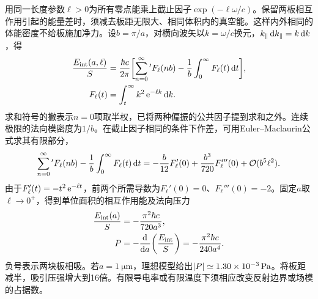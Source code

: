 用同一长度参数$\ell > 0$为所有零点能乘上截止因子$\exp(-\ell\omega/c)$。保留两板相互作用引起的能量差时，须减去板距无限大、相同体积内的真空能。这样内外相同的体能密度不给板施加净力。设$b = \pi/a$，对横向波矢以$k = \omega/c$换元，$k_\parallel\mathop{}\!\mathrm{d} k_\parallel = k\mathop{}\!\mathrm{d} k$，得
\begin{align*}
    \frac{E_{\rm int}(a,\ell)}{S}
       &= \frac{\hbar c}{2\pi}\biggl[
           \sum_{n=0}^\infty{}'F_\ell(nb)
           - \frac{1}{b}\int_0^\infty F_\ell(t)\mathop{}\!\mathrm{d} t\biggr],\\
    F_\ell(t) &= \int_t^\infty k^2\mathop{}\!\mathrm{e}^{-\ell k}\mathop{}\!\mathrm{d} k .
\end{align*}
求和符号的撇表示$n = 0$项取半权，已将两种偏振的公共因子提到求和之外。连续极限的法向模密度为$1/b$。在截止因子相同的条件下作差，可用Euler--Maclaurin公式求其有限部分，
\[
    \sum_{n=0}^\infty{}'F_\ell(nb) - \frac{1}{b}\int_0^\infty F_\ell(t)\mathop{}\!\mathrm{d} t
       = -\frac{b}{12}F_\ell'(0) + \frac{b^3}{720}F_\ell'''(0) + \mathcal{O}(b^5\ell^2).
\]
由于$F_\ell'(t) = -t^2\mathop{}\!\mathrm{e}^{-\ell t}$，前两个所需导数为$F_\ell'(0) = 0$、$F_\ell'''(0) = -2$。固定$a$取$\ell \to 0^+$，得到单位面积的相互作用能及法向压力
\begin{subequations}
    \begin{align}
        \frac{E_{\rm int}(a)}{S} &= -\frac{\pi^2\hbar c}{720a^3},\\
        P &= -\frac{\mathop{}\!\mathrm{d}^{}}{\mathrm{d}{a}^{}}\biggl(\frac{E_{\rm int}}S\biggr) = -\frac{\pi^2\hbar c}{240a^4}. \label{eqn:Casimir pressure}
    \end{align}
\end{subequations}
负号表示两块板相吸。若$a = \qty{1}{\micro\metre}$，理想模型给出$\lvert P\rvert \simeq \qty{1.30e-3}{\pascal}$。将板距减半，吸引压强增大到16倍。有限导电率或有限温度下须相应改变反射边界或场模的占据数。
